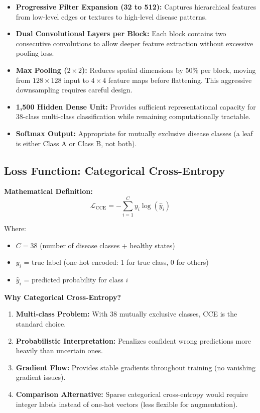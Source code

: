 \documentclass[11pt,a4paper]{article}
\begin{document}
\begin{itemize}
    \item \textbf{Progressive Filter Expansion (32 to 512):} Captures hierarchical features from low-level edges or textures to high-level disease patterns.
    
    \item \textbf{Dual Convolutional Layers per Block:} Each block contains two consecutive convolutions to allow deeper feature extraction without excessive pooling loss.
    
    \item \textbf{Max Pooling ($2 \times 2$):} Reduces spatial dimensions by 50\% per block, moving from $128 \times 128$ input to $4 \times 4$ feature maps before flattening. This aggressive downsampling requires careful design.
    
    \item \textbf{1,500 Hidden Dense Unit:} Provides sufficient representational capacity for 38-class multi-class classification while remaining computationally tractable.
    
    \item \textbf{Softmax Output:} Appropriate for mutually exclusive disease classes (a leaf is either Class A or Class B, not both).
\end{itemize}

\subsection{Loss Function: Categorical Cross-Entropy}

\textbf{Mathematical Definition:}
\begin{equation}
\mathcal{L}_{\text{CCE}} = -\sum_{i=1}^{C} y_i \log(\hat{y}_i)
\end{equation}

Where:
\begin{itemize}
    \item $C = 38$ (number of disease classes + healthy states)
    \item $y_i$ = true label (one-hot encoded: 1 for true class, 0 for others)
    \item $\hat{y}_i$ = predicted probability for class $i$
\end{itemize}

\textbf{Why Categorical Cross-Entropy?}
\begin{enumerate}
    \item \textbf{Multi-class Problem:} With 38 mutually exclusive classes, CCE is the standard choice.
    \item \textbf{Probabilistic Interpretation:} Penalizes confident wrong predictions more heavily than uncertain ones.
    \item \textbf{Gradient Flow:} Provides stable gradients throughout training (no vanishing gradient issues).
    \item \textbf{Comparison Alternative:} Sparse categorical cross-entropy would require integer labels instead of one-hot vectors (less flexible for augmentation).
\end{enumerate}
\end{document}
